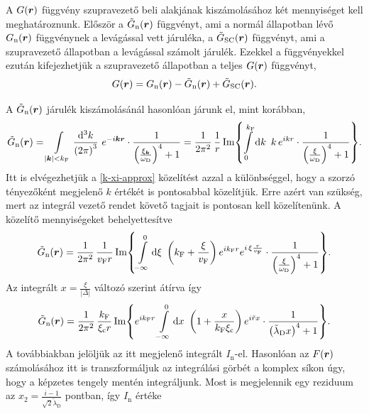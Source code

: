 \documentclass[a4paper,12pt,titlepage]{article}
\newcommand{\KK}{{\vb*{k}}}
\newcommand{\RR}{{\vb*{r}}}
\newcommand{\kF}{{k_\text{F}}}
\newcommand{\vF}{{v_\text{F}}}
\begin{document}
A $G(\RR)$ függvény szupravezető beli alakjának kiszámolásához két mennyiséget kell meghatároznunk.  Először a $\tilde{G}_\text{n}(\RR)$ függvényt, ami a normál állapotban lévő $G_\text{n}(\RR)$ függvénynek a levágással vett járuléka, a $\tilde{G}_\text{SC}(\RR)$ függvényt, ami a szupravezető állapotban a levágással számolt járulék.  Ezekkel a függvényekkel ezután kifejezhetjük a szupravezető állapotban a teljes $G(\RR)$ függvényt,
\begin{equation}
	G(\RR) = G_\text{n}(\RR) - \tilde{G}_\text{n}(\RR) + \tilde{G}_\text{SC}(\RR).
\end{equation}

A $\tilde{G}_\text{n}(\RR)$ járulék kiszámolásánál hasonlóan járunk el, mint korábban,
\begin{equation}
	\tilde{G}_\text{n}(\RR) = \int\limits_{\left| \KK \right| < \kF} \frac{\dd[3]{k}}{\left( 2 \pi \right)^3} ~ e^{-i \KK \RR} \cdot \frac{1}{\left( \frac{\xi_\KK}{\omega_\text{D}} \right)^4 + 1} = \frac{1}{2 \pi^2} \, \frac{1}{r} \Im{ \int\limits_0^{\kF} \dd{k} ~ k \, e^{i k r} \cdot \frac{1}{\left( \frac{\xi}{\omega_\text{D}} \right)^4 + 1} }.
\end{equation}
Itt is elvégezhetjük a \eqref{k-xi-approx} közelítést azzal a különbséggel, hogy a szorzó tényezőként megjelenő $k$ értékét is pontosabbal közelítjük.  Erre azért van szükség, mert az integrál vezető rendet követő tagjait is pontosan kell közelítenünk.  A közelítő mennyiségeket behelyettesítve
\begin{equation}
	\tilde{G}_\text{n}(\RR) = \frac{1}{2 \pi^2} \, \frac{1}{\vF r} \Im{ \int\limits_{-\infty}^0 \dd{\xi} ~ \left( \kF + \frac{\xi}{\vF} \right) e^{i \kF r} e^{i \, \xi \frac{r}{\vF}} \cdot \frac{1}{\left( \frac{\xi}{\omega_\text{D}} \right)^4 + 1} }.
\end{equation}
Az integrált $x = \frac{\xi}{\left| \Delta \right|}$ változó szerint átírva így
\begin{equation}
	\tilde{G}_\text{n}(\RR) = \frac{1}{2 \pi^2} \, \frac{\kF}{\xi_\text{c} r} \Im{ e^{i \kF r} \int\limits_{-\infty}^0 \dd{x} ~ \left( 1 + \frac{x}{\kF \xi_\text{c}} \right) e^{i \tilde{r} x} \cdot \frac{1}{\left( \tilde{\lambda}_\text{D} x \right)^4 + 1} }.
\end{equation}
A továbbiakban jelöljük az itt megjelenő integrált $I_\text{n}$-el.  Hasonlóan az $F(\RR)$ számolásához itt is transzformáljuk az integrálási görbét a komplex síkon úgy, hogy a képzetes tengely mentén integráljunk.  Most is megjelennik egy reziduum az $x_2 = \frac{i - 1}{\sqrt{2} \tilde{\lambda}_\text{D}}$ pontban, így $I_\text{n}$ értéke
\end{document}
